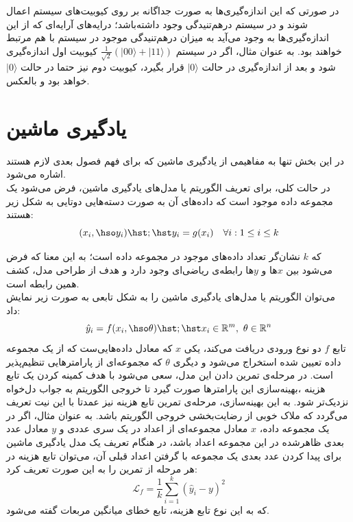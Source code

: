 در صورتی که این اندازه‌گیری‌ها به صورت جداگانه بر روی کیوبیت‌های سیستم اعمال شوند و در سیستم در‌هم‌تنیدگی وجود داشته‌باشد؛ درایه‌های آرایه‌ای که از این اندازه‌گیری‌ها به وجود می‌آید به میزان درهم‌تنیدگی موجود در سیستم با هم مرتبط خواهند بود. به عنوان مثال، اگر در سیستم
$\frac{1}{\sqrt{2}} (|00\rangle + |11\rangle)$
کیوبیت اول اندازه‌گیری شود و بعد از اندازه‌گیری در حالت 
$|0\rangle$
قرار بگیرد، کیوبیت دوم نیز حتما در حالت
$|0\rangle$
خواهد بود و بالعکس.


\newpage

\section{یادگیری ماشین}
در این بخش تنها به مفاهیمی از یادگیری ماشین که برای فهم فصول بعدی لازم هستند اشاره می‌شود. \\
در حالت کلی، برای تعریف الگوریتم یا مدل‌های یادگیری ماشین، فرض می‌شود یک مجموعه داده موجود است که داده‌های آن به صورت دسته‌هایی دوتایی به شکل زیر هستند:
\begin{equation}
    (x_i, \hso y_i) \hst ; \hst y_i = g(x_i) \quad  \forall i : 1 \leq i \leq k
\end{equation}

که
$k$
نشان‌گر تعداد داده‌های موجود در مجموعه داده است؛
به این معنا که فرض می‌شود بین 
$x$ها
و
$y$ها
رابطه‌ی ریاضی‌ای وجود دارد و هدف از طراحی مدل، کشف همین رابطه است. \\
می‌توان الگوریتم یا مدل‌های یادگیری ماشین را به شکل تابعی به صورت زیر نمایش داد:
\begin{equation}
    \Hat{y}_i = f(x_i, \hso \theta) \hst ; \hst x_i \in \mathbb{R}^m, \hspace{1.2mm} \theta \in \mathbb{R}^n
\end{equation}
تابع
$f$
دو نوع ورودی دریافت می‌کند، یکی
$x$
که معادل داده‌هایی‌ست که از یک مجموعه داده تعیین شده استخراج می‌شود و دیگری
$\theta$
که مجموعه‌ای از پارامترهایی تنظیم‌پذیر است. در مرحله‌ی تمرین دادن
این مدل، سعی می‌شود با هدف کمینه کردن یک تابع هزینه
،بهینه‌سازی این پارامترها صورت گیرد تا خروجی الگوریتم به جواب دل‌خواه نزدیک‌تر شود.
به این بهینه‌سازی، مرحله‌ی تمرین
تابع هزینه نیز عمدتا با این نیت تعریف می‌گردد که ملاک خوبی از رضایت‌بخشی خروجی الگوریتم باشد. به عنوان مثال، اگر در یک مجموعه داده،
$x$
معادل مجموعه‌ای از اعداد در یک سری عددی
و
$y$
معادل عدد بعدی ظاهرشده در این مجموعه اعداد باشد، در هنگام تعریف یک مدل یادگیری ماشین برای پیدا کردن عدد بعدی یک مجموعه با گرفتن اعداد قبلی آن، می‌توان تابع هزینه در هر مرحله از تمرین را به این صورت تعریف کرد:
\begin{equation}
    \mathcal{L}_f = \frac{1}{k} \sum_{i=1}^{k} (\hat{y}_i - y)^2
\end{equation}
که به این نوع تابع هزینه، تابع خطای میانگین مربعات
گفته می‌شود.
\newpage

